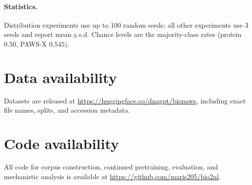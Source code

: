 \documentclass[11pt]{article}
\begin{document}
\paragraph{Statistics.} Distribution experiments use up to 100 random seeds; all other experiments
use 3 seeds and report mean\,$\pm$\,s.d. Chance levels are the majority-class rates (protein $0.50$,
PAWS-X $0.545$).

\section*{Data availability}
Datasets are released at \url{https://huggingface.co/dnagpt/biopaws}, including exact file names,
splits, and accession metadata.

\section*{Code availability}
All code for corpus construction, continued pretraining, evaluation, and mechanistic analysis is
available at \url{https://github.com/maris205/bio2nl}.



\end{document}
